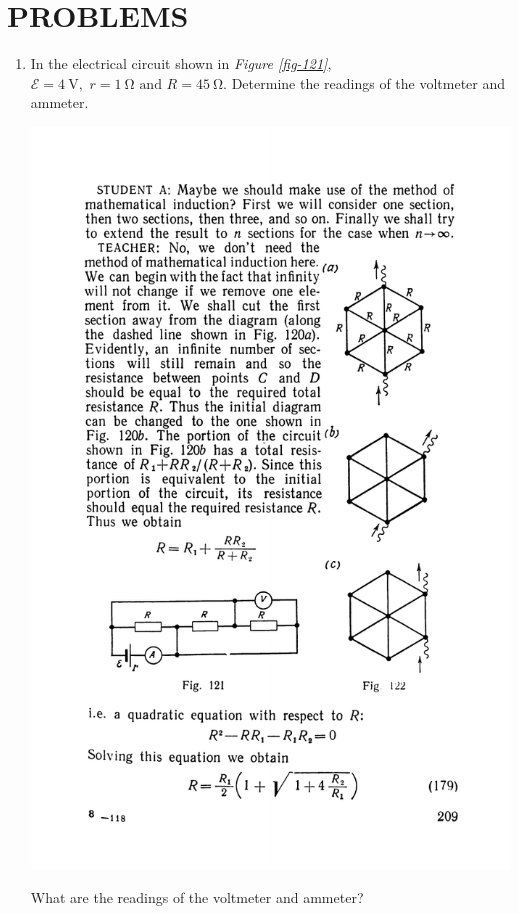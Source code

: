 \documentclass[a4paper,sfsidenotes]{tufte-book}
\newcommand{\Ea}{\mathcal{E}}
\begin{document}
\section{PROBLEMS}
\label{sec-30-1}
\begin{enumerate}[resume=problems]
\item In the electrical circuit shown in \emph{Figure \ref{fig-121}}, $\Ea=\SI{4}{\volt},\,\,  r= \SI{1}{\ohm} \,\, \text{and} \,\, R=\SI{45}{\ohm}$. Determine the readings of the voltmeter and ammeter.

\begin{marginfigure}[-8cm]
\centering
\includegraphics[width=1.1\linewidth]{fig-121a}
\caption{ What are the readings of the voltmeter and ammeter?}
\label{fig-121}
\end{marginfigure}


\end{enumerate}
\end{document}
